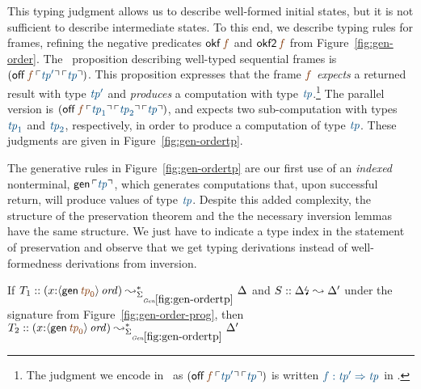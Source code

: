 This typing judgment allows us to describe well-formed initial states,
but it is not sufficient to describe intermediate states. To this end,
we describe typing rules for frames, refining the negative predicates
${\sf okf}\,\lf{f}$ and ${\sf okf2}\,\lf{f}$ from
Figure~\ref{fig:gen-order}. The \sls~proposition describing well-typed
sequential frames is $({\sf off}\,\lf{f}\,\interp{{\it
    tp}'}\,\interp{\it tp})$. This proposition expresses that the frame
$\lf{f}$ {\it expects} a returned result with type $\obj{\it tp'}$ and
{\it produces} a computation with type $\obj{{\it tp}}$.\footnote{The
  judgment we encode in \sls~as $({\sf off}\,\lf{f}\,\interp{{\it
      tp}'}\,\interp{\it tp})$ is written $\obj{f : {\it tp}'
    \Rightarrow {\it tp}}$ in \cite[Chapter 27]{harper12practical}.}
The parallel version is $({\sf off}\,\lf{f}\,\interp{{\it
    tp}_1}\,\interp{{\it tp}_2}\,\interp{\it tp})$, and expects two
sub-computation with types $\obj{{\it tp}_1}$ and $\obj{{\it tp}_2}$,
respectively, in order to produce a computation of type $\obj{{\it
    tp}}$. These judgments are given in Figure~\ref{fig:gen-ordertp}. 

The generative rules in Figure~\ref{fig:gen-ordertp} are our first use
of an {\it indexed} nonterminal, ${\sf gen}\,\interp{\it tp}$, which
generates computations that, upon successful return, will produce
values of type $\obj{\it tp}$. Despite this added complexity, the
structure of the preservation theorem and the the necessary inversion
lemmas have the same structure. We just have to indicate a type index
in the statement of preservation and observe that we get typing
derivations instead of well-formedness derivations from inversion.

\bigskip
\begin{theorem}
\label{thm:siggenordertp}
If $T_1 :: (x{:}\istrue{\susp{{\sf gen}\,\lf{{\it tp}_0}}}) \leadsto^*_{\siggenordertp} 
   \Delta$ and $S :: {\Delta}{\mbox{\lightning}}_{} \leadsto \Delta'$
under the signature from Figure~\ref{fig:gen-order-prog}, then
$T_2 :: (x{:}\istrue{\susp{{\sf gen}\,\lf{{\it tp}_0}}}) \leadsto^*_{\siggenordertp} 
   \Delta'$
\end{theorem}

